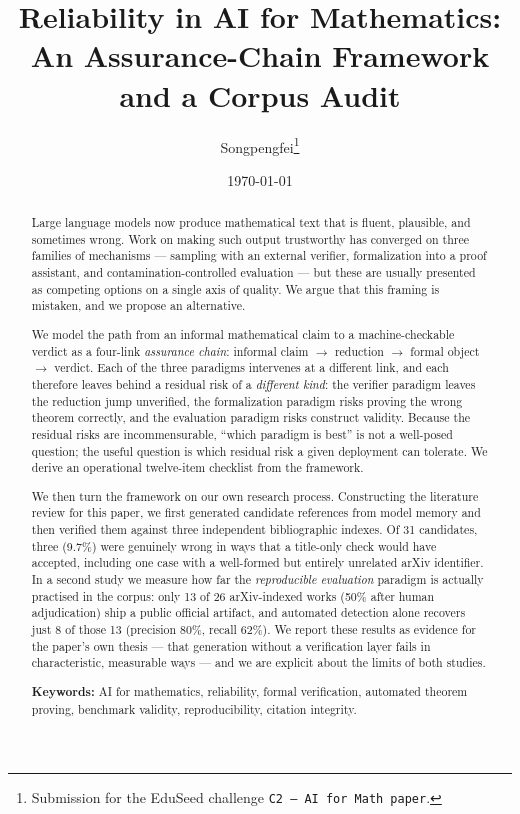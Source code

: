 \documentclass[11pt,a4paper]{article}
\title{\bfseries Reliability in AI for Mathematics:\\
An Assurance-Chain Framework and a Corpus Audit}
\author{Songpengfei\thanks{Submission for the EduSeed challenge
  \texttt{C2 --- AI for Math paper}.}}
\date{\today}
\begin{document}
\maketitle

\begin{abstract}
\noindent
Large language models now produce mathematical text that is fluent, plausible,
and sometimes wrong. Work on making such output trustworthy has converged on
three families of mechanisms --- sampling with an external verifier,
formalization into a proof assistant, and contamination-controlled evaluation
--- but these are usually presented as competing options on a single axis of
quality. We argue that this framing is mistaken, and we propose an alternative.

We model the path from an informal mathematical claim to a machine-checkable
verdict as a four-link \emph{assurance chain}: informal claim $\rightarrow$
reduction $\rightarrow$ formal object $\rightarrow$ verdict. Each of the three
paradigms intervenes at a different link, and each therefore leaves behind a
residual risk of a \emph{different kind}: the verifier paradigm leaves the
reduction jump unverified, the formalization paradigm risks proving the wrong
theorem correctly, and the evaluation paradigm risks construct validity. Because
the residual risks are incommensurable, ``which paradigm is best'' is not a
well-posed question; the useful question is which residual risk a given
deployment can tolerate. We derive an operational twelve-item checklist from
the framework.

We then turn the framework on our own research process. Constructing the
literature review for this paper, we first generated candidate references from
model memory and then verified them against three independent bibliographic
indexes. Of 31 candidates, three (9.7\%) were genuinely wrong in ways that a
title-only check would have accepted, including one case with a well-formed but
entirely unrelated arXiv identifier. In a second study we measure how far the
\emph{reproducible evaluation} paradigm is actually practised in the corpus:
only 13 of 26 arXiv-indexed works (50\% after human adjudication) ship a public
official artifact, and automated detection alone recovers just 8 of those 13
(precision 80\%, recall 62\%).
We report these results as evidence for the paper's own thesis --- that
generation without a verification layer fails in characteristic, measurable
ways --- and we are explicit about the limits of both studies.

\medskip
\noindent\textbf{Keywords:} AI for mathematics, reliability, formal
verification, automated theorem proving, benchmark validity, reproducibility,
citation integrity.

\end{abstract}
\end{document}
